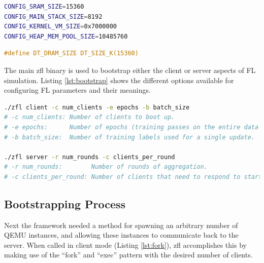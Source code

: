 \documentclass[12pt]{article}
\begin{document}
\begin{minipage}[b][][b]{.45\textwidth}
\begin{lstlisting}[language=bash,caption={Zephyr prj.conf},label={lst:prj.conf}]
CONFIG_SRAM_SIZE=15360
CONFIG_MAIN_STACK_SIZE=8192
CONFIG_KERNEL_VM_SIZE=0x7000000
CONFIG_HEAP_MEM_POOL_SIZE=10485760
\end{lstlisting}
\end{minipage}\hfill
\begin{minipage}[b][][b]{.45\textwidth}
\begin{lstlisting}[language=C,caption={QEMU board.dts},label={lst:board}]
#define DT_DRAM_SIZE DT_SIZE_K(15360)
\end{lstlisting}
\end{minipage}

The main zfl binary is used to bootstrap either the client or server aspects of FL simulation.
Listing \ref{lst:bootstrap} shows the different options available for configuring FL parameters and
their meanings.
\begin{lstlisting}[language=bash,caption={The main zfl binary},label={lst:bootstrap}]
./zfl client -c num_clients -e epochs -b batch_size
# -c num_clients: Number of clients to boot up.
# -e epochs:      Number of epochs (training passes on the entire data set).
# -b batch_size:  Number of training labels used for a single update.

./zfl server -r num_rounds -c clients_per_round
# -r num_rounds:        Number of rounds of aggregation.
# -c clients_per_round: Number of clients that need to respond to start a round.
\end{lstlisting}

\subsection{Bootstrapping Process}
Next the framework needed a method for spawning an arbitrary number of QEMU instances, and allowing
these instances to communicate back to the server. When called in client mode (Listing
\ref{lst:fork}), zfl accomplishes this
by making use of the ``fork'' and ``exec'' pattern with the desired number of clients. \\
\end{document}
